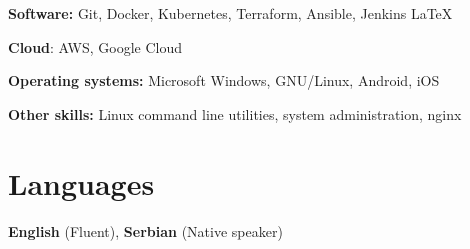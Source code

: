 \documentclass[11pt,a4paper,roman]{moderncv}        %
\begin{document}
\textbf{Software:} Git, Docker, Kubernetes, Terraform, Ansible, Jenkins \LaTeX

\textbf{Cloud}: AWS, Google Cloud

\textbf{Operating systems: } Microsoft Windows, GNU/Linux, Android, iOS

\textbf{Other skills: } Linux command line utilities, system administration, nginx

\section{Languages}
	\textbf{English} (Fluent), \textbf{Serbian} (Native speaker)
\end{document}
